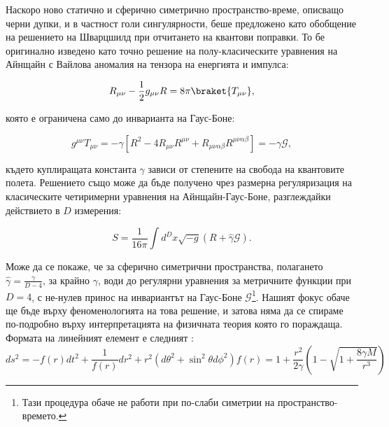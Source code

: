 Наскоро ново статично и сферично симетрично пространство-време, описващо черни дупки, и в частност голи сингулярности, беше предложено като обобщение на решението на Шварцшилд при отчитането на квантови поправки. То бе оригинално изведено като точно решение на полу-класическите уравнения на Айнщайн с Вайлова аномалия на тензора на енергията и импулса:

\begin{equation}
	R_{\mu\nu} - \frac{1}{2}g_{\mu\nu}R = 8\pi\braket{T_{\mu\nu}},
\end{equation}

която е ограничена само до инварианта на Гаус-Боне:

\begin{equation}
	g^{\mu\nu}T_{\mu\nu} = -\gamma\left[R^2 - 4R_{\mu\nu}R^{\mu\nu} + R_{\mu\nu\alpha\beta}R^{\mu\nu\alpha\beta}\right] = -\gamma\mathcal{G},
\end{equation}

където куплиращата константа $\gamma$ зависи от степените на свобода на квантовите полета. Решението също може да бъде получено чрез размерна регуляризация на класическите четиримерни уравнения на Айнщайн-Гаус-Боне, разглеждайки действието в $D$ измерения:

\begin{equation}
	S = \frac{1}{16\pi}\int d^Dx\sqrt{-g}\left(R + \hat{\gamma}\mathcal{G}\right).
\end{equation}

Може да се покаже, че за сферично симетрични пространства, полагането $\hat{\gamma} = \frac{\gamma}{D - 4}$, за крайно $\gamma$, води до регулярни уравнения за метричните функции при $D = 4$, с не-нулев принос на инвариантът на Гаус-Боне $\mathcal{G}$\footnote{Тази процедура обаче не работи при по-слаби симетрии на пространство-времето.}\cite{Fernandes_2022}. Нашият фокус обаче ще бъде върху феноменологията на това решение, и затова няма да се спираме по-подробно върху интерпретацията на физичната теория която го пораждаща. Формата на линейният елемент е следният \cite{Cai:2009ua}:
\begin{subequations}
	\begin{equation}
		ds^2 = -f(r)dt^2 + \frac{1}{f(r)}dr^2 + r^2(d\theta^2 + \sin^2\theta d\phi^2)
	\end{equation}
	\begin{equation}
		f(r) = 1 + \frac{r^2}{2\gamma}\left(1 - \sqrt{1 + \frac{8\gamma M}{r^3}}\right)
	\end{equation}
\end{subequations}

